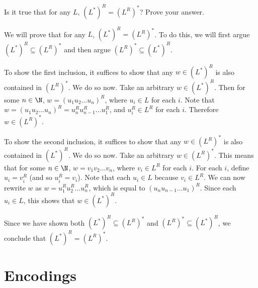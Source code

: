 \begin{flex}
\begin{exercise} \label{exercise:Can-you-interchange-star-and-reversal}
Is it true that for any  $L$, $(L^*)^R = (L^R)^*$? Prove your answer.
\end{exercise}


\begin{solution}
We will prove that for any  $L$, $(L^*)^R = (L^R)^*$. To do this, we will first argue $(L^*)^R \subseteq (L^R)^*$ and then argue $(L^R)^* \subseteq (L^*)^R$.

To show the first inclusion, it suffices to show that any $w \in (L^*)^R$ is also contained in $(L^R)^*$. We do so now. Take an arbitrary $w \in (L^*)^R$. Then for some $n \in \N$, $w = (u_1u_2\ldots u_n)^R$, where $u_i \in L$ for each $i$. Note that $w = (u_1u_2\ldots u_n)^R = u_n^R u_{n-1}^R \ldots u_1^R$, and $u_i^R \in L^R$ for each $i$. Therefore $w \in (L^R)^*$.

To show the second inclusion, it suffices to show that any $w \in (L^R)^*$ is also contained in $(L^*)^R$. We do so now. Take an arbitrary $w \in (L^R)^*$. This means that for some $n \in \N$, $w = v_1 v_2 \ldots v_n$, where $v_i \in L^R$ for each $i$. For each $i$, define $u_i = v_i^R$ (and so $u_i^R = v_i$). Note that each $u_i \in L$ because $v_i \in L^R$. We can now rewrite $w$ as $w = u_1^R u_2^R \ldots u_n^R$, which is equal to $(u_n u_{n-1} \ldots u_1)^R$. Since each $u_i \in L$, this shows that $w \in (L^*)^R$.

Since we have shown both $(L^*)^R \subseteq (L^R)^*$ and $(L^R)^* \subseteq (L^*)^R$, we conclude that $(L^*)^R = (L^R)^*$.
\end{solution}
\end{flex}




\section{Encodings}
\label{section:Encodings}


